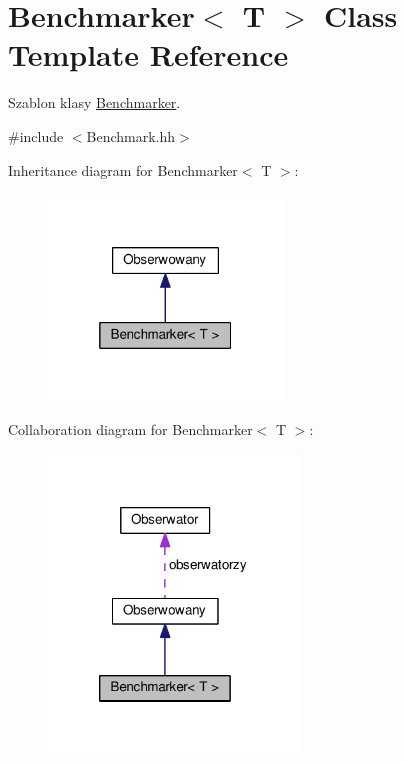 \hypertarget{a00009}{}\section{Benchmarker$<$ T $>$ Class Template Reference}
\label{a00009}


Szablon klasy \hyperlink{a00009}{Benchmarker}.  




{\ttfamily \#include $<$Benchmark.\+hh$>$}



Inheritance diagram for Benchmarker$<$ T $>$\+:
\nopagebreak
\begin{figure}[H]
\begin{center}
\leavevmode
\includegraphics[width=176pt]{a00139}
\end{center}
\end{figure}


Collaboration diagram for Benchmarker$<$ T $>$\+:
\nopagebreak
\begin{figure}[H]
\begin{center}
\leavevmode
\includegraphics[width=190pt]{a00140}
\end{center}
\end{figure}
